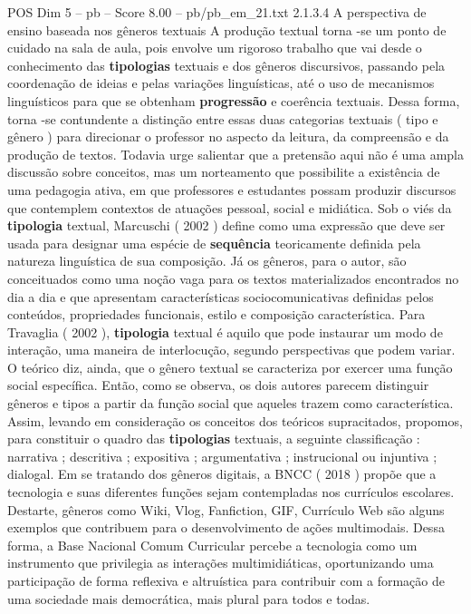 \begin{textsample}{POS Dim 5 – pb – Score 8.00 – pb/pb\_em\_21.txt}  \label{ex:f5_pos_094}
2.1.3.4 A perspectiva de ensino baseada nos gêneros textuais A produção textual torna -se um ponto de cuidado na sala de aula, pois envolve um rigoroso trabalho que vai desde o conhecimento das \textbf{tipologias} textuais e dos gêneros discursivos, passando pela coordenação de ideias e pelas variações linguísticas, até o uso de mecanismos linguísticos para que se obtenham \textbf{progressão} e coerência textuais.
Dessa forma, torna -se contundente a distinção entre essas duas categorias textuais ( tipo e gênero ) para direcionar o professor no aspecto da leitura, da compreensão e da produção de textos.
Todavia urge salientar que a pretensão aqui não é uma ampla discussão sobre conceitos, mas um norteamento que possibilite a existência de uma pedagogia ativa, em que professores e estudantes possam produzir discursos que contemplem contextos de atuações pessoal, social e midiática.
Sob o viés da \textbf{tipologia} textual, Marcuschi ( 2002 ) define como uma expressão que deve ser usada para designar uma espécie de \textbf{sequência} teoricamente definida pela natureza linguística de sua composição.
Já os gêneros, para o autor, são conceituados como uma noção vaga para os textos materializados encontrados no dia a dia e que apresentam características sociocomunicativas definidas pelos conteúdos, propriedades funcionais, estilo e composição característica.
Para Travaglia ( 2002 ), \textbf{tipologia} textual é aquilo que pode instaurar um modo de interação, uma maneira de interlocução, segundo perspectivas que podem variar.
O teórico diz, ainda, que o gênero textual se caracteriza por exercer uma função social específica.
Então, como se observa, os dois autores parecem distinguir gêneros e tipos a partir da função social que aqueles trazem como característica.
Assim, levando em consideração os conceitos dos teóricos supracitados, propomos, para constituir o quadro das \textbf{tipologias} textuais, a seguinte classificação : narrativa ; descritiva ; expositiva ; argumentativa ; instrucional ou injuntiva ; dialogal.
Em se tratando dos gêneros digitais, a BNCC ( 2018 ) propõe que a tecnologia e suas diferentes funções sejam contempladas nos currículos escolares.
Destarte, gêneros como Wiki, Vlog, Fanfiction, GIF, Currículo Web são alguns exemplos que contribuem para o desenvolvimento de ações multimodais.
Dessa forma, a Base Nacional Comum Curricular percebe a tecnologia como um instrumento que privilegia as interações multimidiáticas, oportunizando uma participação de forma reflexiva e altruística para contribuir com a formação de uma sociedade mais democrática, mais plural para todos e todas.

\end{textsample}
